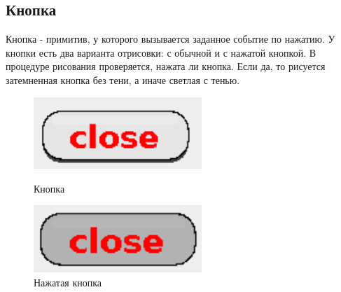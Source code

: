 \documentclass[14pt]{extarticle}
\begin{document}
	\subsection*{Кнопка}
	Кнопка - примитив, у которого вызывается заданное событие по нажатию. У кнопки есть два варианта отрисовки: с обычной и с нажатой кнопкой. В процедуре рисования проверяется, нажата ли кнопка. Если да, то рисуется затемненная кнопка без тени, а иначе светлая с тенью.
		\begin{figure}[h]
		\begin{center}
		\begin{minipage}[h]{0.4\linewidth}
		\includegraphics[width=180pt]{pictures/close1.png}
		\caption{ Кнопка} %
		\label{ris:b1} %
		\end{minipage}
		\hfill 
		\begin{minipage}[h]{0.4\linewidth}
		\includegraphics[width=180pt]{pictures/close2.png}
		\caption{Нажатая кнопка}
		\label{ris:b2}
		\end{minipage}
		\end{center}
		\end{figure}	
		
\end{document}
